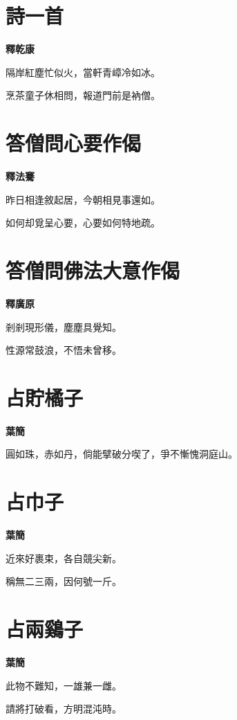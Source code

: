 \documentclass[12pt,a4paper]{ctexbook}
\begin{document}
\section{詩一首}
\textbf{釋乾康}\par\vspace{0.5em}
隔岸紅塵忙似火，當軒青嶂冷如冰。\par
烹茶童子休相問，報道門前是衲僧。\par

\section{答僧問心要作偈}
\textbf{釋法騫}\par\vspace{0.5em}
昨日相逢敘起居，今朝相見事還如。\par
如何却覓呈心要，心要如何特地疏。\par

\section{答僧問佛法大意作偈}
\textbf{釋廣原}\par\vspace{0.5em}
剎剎現形儀，塵塵具覺知。\par
性源常鼓浪，不悟未曾移。\par

\section{占貯橘子}
\textbf{葉簡}\par\vspace{0.5em}
圓如珠，赤如丹，倘能擘破分喫了，爭不慚愧洞庭山。\par

\section{占巾子}
\textbf{葉簡}\par\vspace{0.5em}
近來好裹束，各自競尖新。\par
稱無二三兩，因何號一斤。\par

\section{占兩鷄子}
\textbf{葉簡}\par\vspace{0.5em}
此物不難知，一雄兼一雌。\par
請將打破看，方明混沌時。\par
\end{document}
